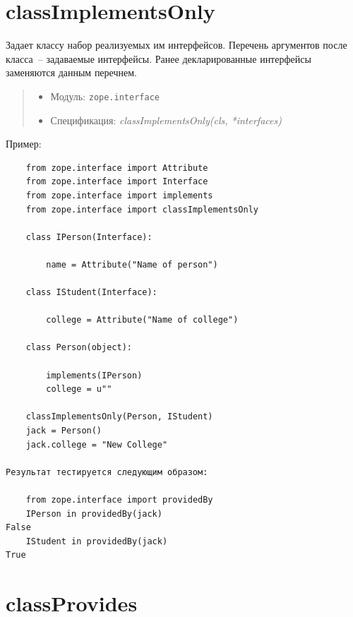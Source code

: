 \documentclass[a4paper,openany,twoside,final]{book}
\providecommand*{\DUroletitlereference}[1]{\textsl{#1}}
\begin{document}
\section*{classImplementsOnly%
  \label{classimplementsonly}%
}

Задает классу набор реализуемых им интерфейсов.  Перечень аргументов после класса~-- задаваемые интерфейсы.  Ранее декларированные интерфейсы заменяются данным перечнем.

\begin{quote}

\begin{itemize}

\item Модуль: \texttt{zope.interface}

\item Спецификация: \DUroletitlereference{classImplementsOnly(cls, *interfaces)}

\end{itemize}

\end{quote}

Пример:

\begin{verbatim}
    from zope.interface import Attribute
    from zope.interface import Interface
    from zope.interface import implements
    from zope.interface import classImplementsOnly

    class IPerson(Interface):

        name = Attribute("Name of person")

    class IStudent(Interface):

        college = Attribute("Name of college")

    class Person(object):

        implements(IPerson)
        college = u""

    classImplementsOnly(Person, IStudent)
    jack = Person()
    jack.college = "New College"

Результат тестируется следующим образом:

    from zope.interface import providedBy
    IPerson in providedBy(jack)
False
    IStudent in providedBy(jack)
True
\end{verbatim}


\section*{classProvides%
  \label{classprovides}%
}
\end{document}
